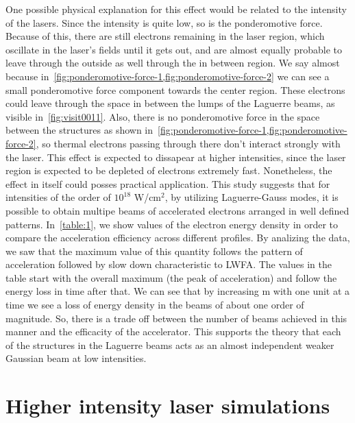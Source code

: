 \documentclass[12pt, class=report, crop=false]{standalone}
\begin{document}
One possible physical explanation for this effect would be related to the intensity of the lasers. Since the intensity is quite low, so is the ponderomotive force. Because of this, there are still electrons remaining in the laser region, which oscillate in the laser's fields until it gets out, and are almost equally probable to leave through the outside as well through the in between region. We say almost because in~\cref{fig:ponderomotive-force-1,fig:ponderomotive-force-2} we can see a small ponderomotive force component towards the center region. These electrons could leave through the space in between the lumps of the Laguerre beams, as visible in~\cref{fig:visit0011}. Also, there is no  ponderomotive force in the space between the structures as shown in~\cref{fig:ponderomotive-force-1,fig:ponderomotive-force-2}, so thermal electrons passing through there don't interact strongly with the laser. This effect is expected to dissapear at higher intensities, since the laser region is expected to be depleted of electrons extremely fast. Nonetheless, the effect in itself could posses practical application. This study suggests that for intensities of the order of $10^{18}$ W/cm$^2$, by utilizing Laguerre-Gauss modes, it is possible to obtain multipe beams of accelerated electrons arranged in well defined patterns. In~\cref{table:1}, we show values of the electron energy density in order to compare the acceleration efficiency across different profiles. By analizing the data, we saw that the maximum value of this quantity follows the pattern of acceleration followed by slow down characteristic to LWFA. The values in the table start with the overall maximum (the peak of acceleration) and follow the energy loss in time after that. We can see that by increasing m with one unit at a time we see a loss of energy density in the beams of about one order of magnitude. So, there is a trade off between the number of beams achieved in this manner and the efficacity of the accelerator. This supports the theory that each of the structures in the Laguerre beams acts as an almost independent weaker Gaussian beam at low intensities.

\section{Higher intensity laser simulations}
\end{document}
